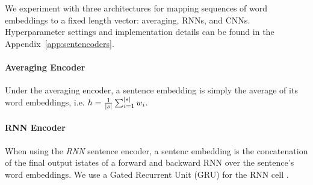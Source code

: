 

We experiment with three architectures for mapping sequences
of word embeddings to a fixed length vector: averaging, RNNs, and CNNs.
Hyperparameter settings and implementation details can be found 
in the Appendix~\ref{app:sentencoders}.

\paragraph{Averaging Encoder} Under the averaging encoder, a sentence embedding
\sentEmb is simply the average of its word embeddings, i.e. $\sentEmb = \frac{1}{\sentSize} \sum_{i=1}^{\sentSize} \wordEmb[i]$.


%

\paragraph{RNN Encoder} When using  the \textit{RNN} sentence encoder,
a sentenc embedding is the 
concatenation 
of the
final output istates of a forward and backward RNN over the sentence's word
embeddings. We use a Gated Recurrent Unit (GRU)  
for the RNN cell \cite{chung2014empirical}.

